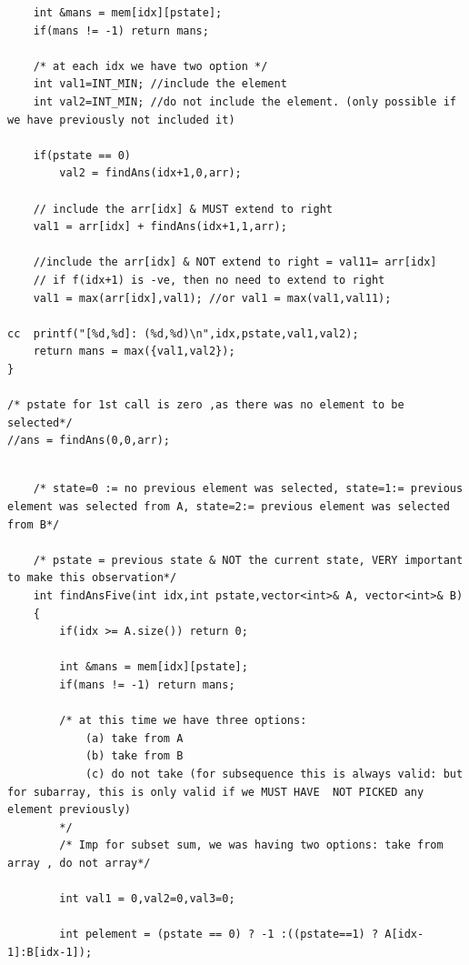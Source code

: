 \begin{solution}
\begin{minipage}{\textwidth}
\begin{lstlisting}
    int &mans = mem[idx][pstate];
    if(mans != -1) return mans;
    
    /* at each idx we have two option */
    int val1=INT_MIN; //include the element 
    int val2=INT_MIN; //do not include the element. (only possible if we have previously not included it)

    if(pstate == 0)
        val2 = findAns(idx+1,0,arr);
    
    // include the arr[idx] & MUST extend to right
    val1 = arr[idx] + findAns(idx+1,1,arr); 

    //include the arr[idx] & NOT extend to right = val11= arr[idx]
    // if f(idx+1) is -ve, then no need to extend to right
    val1 = max(arr[idx],val1); //or val1 = max(val1,val11);

cc  printf("[%d,%d]: (%d,%d)\n",idx,pstate,val1,val2);
    return mans = max({val1,val2});
}

/* pstate for 1st call is zero ,as there was no element to be selected*/
//ans = findAns(0,0,arr); 

\end{lstlisting}
\end{minipage}



\begin{minipage}{\textwidth}
\begin{lstlisting}

    /* state=0 := no previous element was selected, state=1:= previous element was selected from A, state=2:= previous element was selected from B*/

    /* pstate = previous state & NOT the current state, VERY important to make this observation*/
    int findAnsFive(int idx,int pstate,vector<int>& A, vector<int>& B) 
    {
        if(idx >= A.size()) return 0;
        
        int &mans = mem[idx][pstate];
        if(mans != -1) return mans;
        
        /* at this time we have three options:
            (a) take from A
            (b) take from B
            (c) do not take (for subsequence this is always valid: but for subarray, this is only valid if we MUST HAVE  NOT PICKED any element previously)
        */
        /* Imp for subset sum, we was having two options: take from array , do not array*/
        
        int val1 = 0,val2=0,val3=0;
        
        int pelement = (pstate == 0) ? -1 :((pstate==1) ? A[idx-1]:B[idx-1]);
        

\end{lstlisting}
\end{minipage}
\end{solution}

